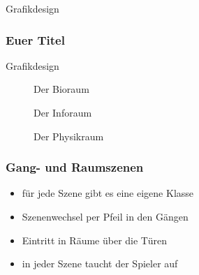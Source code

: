 \begin{frame}
	\begin{center}
		\Huge Grafikdesign
	\end{center}
\end{frame}

\begin{frame}
	\frametitle{Euer Titel}
\end{frame}

\begin{frame}{Grafikdesign}
	\begin{minipage}[v]{0.3 \textwidth}
		\begin{figure}
			\centering
			\caption[Bioraum]{Der Bioraum}
			\label{fig:Bioraum}
		\end{figure}
	\end{minipage}

\vfill

\begin{minipage}[v]{0.3 \textwidth}
	\begin{figure}
		\centering
		\caption[Inforaum]{Der Inforaum}
		\label{fig:Inforaum}
	\end{figure}
\end{minipage}

\vfill

\begin{minipage}[v]{0.3 \textwidth}
	\begin{figure}
		\centering
		\caption[Physikraum]{Der Physikraum}
		\label{fig:Physikraum}
	\end{figure}
\end{minipage}
	
\end{frame}

\begin{frame}
	\begin{minipage}{0.3\textwidth}
		\begin{figure}
			\centering
			\label{fig:kt_farbverlauf}
		\end{figure}
	\end{minipage}
\end{frame}

\begin{frame}
	\frametitle{Gang- und Raumszenen}
	\begin{itemize}
		\item für jede Szene gibt es eine eigene Klasse
		\item Szenenwechsel per Pfeil in den Gängen
		\item Eintritt in Räume über die Türen
		\item in jeder Szene taucht der Spieler auf
	\end{itemize}
\end{frame}


